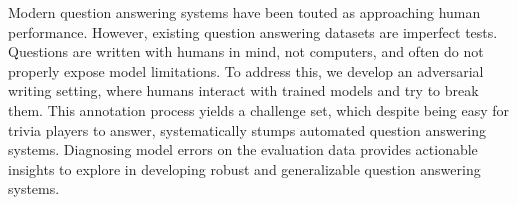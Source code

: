 Modern question answering systems have been touted as approaching human performance. However, existing question answering datasets are imperfect tests. Questions are written with humans in mind, not computers, and often do not properly expose model limitations. To address this, we develop an adversarial writing setting, where humans interact with trained models and try to break them. This annotation process yields a challenge set, which despite being easy for trivia players to answer, systematically stumps automated question answering systems. Diagnosing model errors on the evaluation data provides actionable insights to explore in developing robust and generalizable question answering systems.
